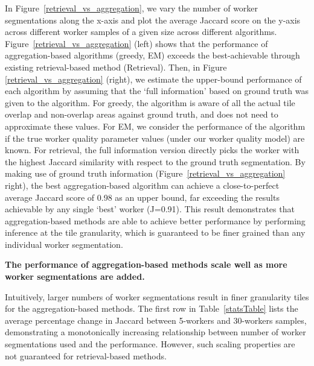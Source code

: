 \documentclass[letterpaper]{article}
\newcommand{\npar}{\par \noindent}
\newcommand{\stitle}[1]{\noindent \textbf{#1}}
\begin{document}
\npar In Figure~\ref{retrieval_vs_aggregation}, we vary the number of worker segmentations along the x-axis and plot the average Jaccard score on the y-axis across different worker samples of a given size across different algorithms. Figure~\ref{retrieval_vs_aggregation} (left) shows that the performance of aggregation-based algorithms (greedy, EM) exceeds the best-achievable through existing retrieval-based method (Retrieval). Then, in Figure \ref{retrieval_vs_aggregation} (right), we estimate the upper-bound performance of each algorithm by assuming that the `full information' based on ground truth was given to the algorithm. For greedy, the algorithm is aware of all the actual tile overlap and non-overlap areas against ground truth, and does not need to approximate these values. For EM, we consider the performance of the algorithm if the true worker quality parameter values (under our worker quality model) are known. For retrieval, the full information version directly picks the worker with the highest Jaccard similarity with respect to the ground truth segmentation. By making use of ground truth information (Figure~\ref{retrieval_vs_aggregation} right), the best aggregation-based algorithm can achieve a close-to-perfect average Jaccard score of 0.98 as an upper bound, far exceeding the results achievable by any single `best' worker (J=0.91). This result demonstrates that aggregation-based methods are able to achieve better performance by performing inference at the tile granularity, which is guaranteed to be finer grained than any individual worker segmentation. 

\stitle{The performance of aggregation-based methods scale well as more worker segmentations are added.}
\par \noindent Intuitively, larger numbers of worker segmentations result in finer granularity tiles for the aggregation-based methods. The first row in Table~\ref{statsTable} lists the average percentage change in Jaccard between 5-workers and 30-workers samples, demonstrating a monotonically increasing relationship between number of worker segmentations used and the performance. However, such scaling properties are not guaranteed for retrieval-based methods.
\end{document}
